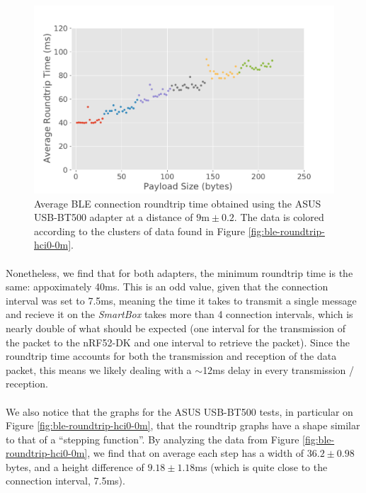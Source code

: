 \begin{figure}[H]
    \centering
    \includegraphics[width=0.75\linewidth]{images/ble-roundtrip-hci0-900cm.pdf}
    \caption[Average \acs{BLE} connection roundtrip time obtained using the ASUS USB-BT500 adapter at a distance of 9m.]{Average \acs{BLE} connection roundtrip time obtained using the ASUS USB-BT500 adapter at a distance of $9\text{m} \pm 0.2$. The data is colored according to the clusters of data found in Figure \ref{fig:ble-roundtrip-hci0-0m}.}
    \label{fig:ble-roundtrip-hci0-9m}
\end{figure}

\paragraph{} Nonetheless, we find that for both adapters, the minimum roundtrip time is the same: appoximately 40ms. This is an odd value, given that the connection interval was set to 7.5ms, meaning the time it takes to transmit a single message and recieve it on the \textit{SmartBox} takes more than 4 connection intervals, which is nearly double of what should be expected (one interval for the transmission of the packet to the nRF52-DK and one interval to retrieve the packet). Since the roundtrip time accounts for both the transmission and reception of the data packet, this means we likely dealing with a $\sim$12ms delay in every transmission / reception.


\paragraph{} We also notice that the graphs for the ASUS USB-BT500 tests, in particular on Figure \ref{fig:ble-roundtrip-hci0-0m}, that the roundtrip graphs have a shape similar to that of a ``stepping function''. By analyzing the data from Figure \ref{fig:ble-roundtrip-hci0-0m}, we find that on average each step has a width of $36.2 \pm 0.98$ bytes, and a height difference of $9.18 \pm 1.18$ms (which is quite close to the connection interval, 7.5ms).

